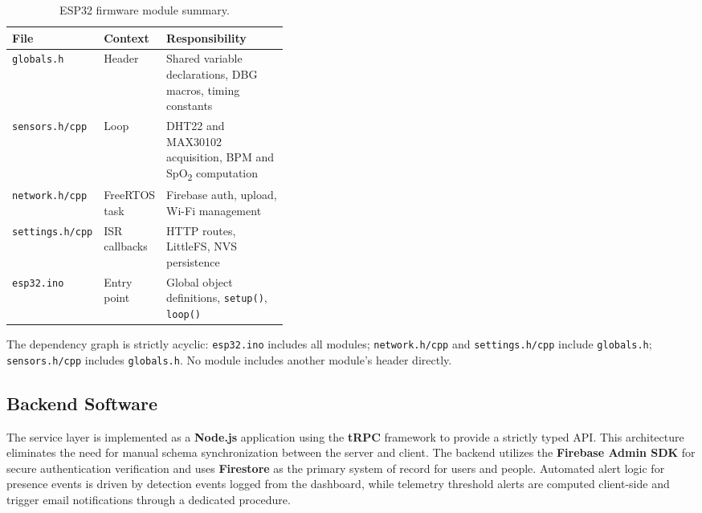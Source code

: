 \begin{table}[H]
	\centering
	\small
	\setlength{\tabcolsep}{4pt}
	\caption{ESP32 firmware module summary.}
	\label{tab:sw_modules}
	\begin{tabularx}{\linewidth}{>{\raggedright\arraybackslash}p{0.22\linewidth} >{\raggedright\arraybackslash}p{0.18\linewidth} X}
		\toprule
		\textbf{File}           & \textbf{Context} & \textbf{Responsibility}                                                  \\
		\midrule
		\texttt{globals.h}      & Header           & Shared variable declarations, DBG macros, timing constants               \\
		\texttt{sensors.h/cpp}  & Loop             & DHT22 and MAX30102 acquisition, BPM and SpO\textsubscript{2} computation \\
		\texttt{network.h/cpp}  & FreeRTOS task    & Firebase auth, upload, Wi-Fi management                                  \\
		\texttt{settings.h/cpp} & ISR callbacks    & HTTP routes, LittleFS, NVS persistence                                   \\
		\texttt{esp32.ino}      & Entry point      & Global object definitions, \texttt{setup()}, \texttt{loop()}             \\
		\bottomrule
	\end{tabularx}
\end{table}

The dependency graph is strictly acyclic: \texttt{esp32.ino} includes all modules;
\texttt{network.h/cpp} and \texttt{settings.h/cpp} include \texttt{globals.h};
\texttt{sensors.h/cpp} includes \texttt{globals.h}.
No module includes another module's header directly.

\subsection*{Backend Software}
The service layer is implemented as a \textbf{Node.js} application using the \textbf{tRPC} framework to provide a strictly typed API. This architecture eliminates the need for manual schema \mbox{synchronization} between the server and client. The backend utilizes the \textbf{Firebase Admin SDK} for secure authentication verification and uses \textbf{Firestore} as the primary system of record for users and people. Automated alert logic for presence events is driven by detection events logged from the dashboard, while telemetry threshold alerts are computed client-side and trigger email notifications through a dedicated procedure.

